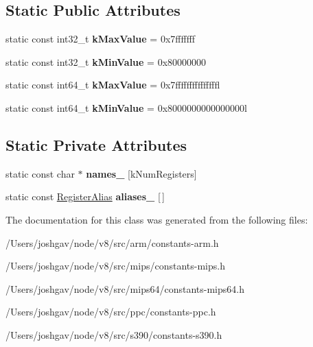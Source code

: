 \subsection*{Static Public Attributes}
\begin{DoxyCompactItemize}
\item 
static const int32\+\_\+t {\bfseries k\+Max\+Value} = 0x7fffffff\hypertarget{classv8_1_1internal_1_1_registers_a07435a8d8060dc8bfdc18d1ffbe1d10d}{}\label{classv8_1_1internal_1_1_registers_a07435a8d8060dc8bfdc18d1ffbe1d10d}

\item 
static const int32\+\_\+t {\bfseries k\+Min\+Value} = 0x80000000\hypertarget{classv8_1_1internal_1_1_registers_a977757720ff82e6ba769664028b5c014}{}\label{classv8_1_1internal_1_1_registers_a977757720ff82e6ba769664028b5c014}

\item 
static const int64\+\_\+t {\bfseries k\+Max\+Value} = 0x7fffffffffffffffl\hypertarget{classv8_1_1internal_1_1_registers_a14c98f9b0700cc0d0469cf55b68b07f5}{}\label{classv8_1_1internal_1_1_registers_a14c98f9b0700cc0d0469cf55b68b07f5}

\item 
static const int64\+\_\+t {\bfseries k\+Min\+Value} = 0x8000000000000000l\hypertarget{classv8_1_1internal_1_1_registers_acede0eeb70488c436626ca92303d2072}{}\label{classv8_1_1internal_1_1_registers_acede0eeb70488c436626ca92303d2072}

\end{DoxyCompactItemize}
\subsection*{Static Private Attributes}
\begin{DoxyCompactItemize}
\item 
static const char $\ast$ {\bfseries names\+\_\+} \mbox{[}k\+Num\+Registers\mbox{]}\hypertarget{classv8_1_1internal_1_1_registers_a758349764f0b67108fce3f91897f5251}{}\label{classv8_1_1internal_1_1_registers_a758349764f0b67108fce3f91897f5251}

\item 
static const \hyperlink{structv8_1_1internal_1_1_registers_1_1_register_alias}{Register\+Alias} {\bfseries aliases\+\_\+} \mbox{[}$\,$\mbox{]}\hypertarget{classv8_1_1internal_1_1_registers_a5b4d1208eaf89a53b8c9ae5da336cba0}{}\label{classv8_1_1internal_1_1_registers_a5b4d1208eaf89a53b8c9ae5da336cba0}

\end{DoxyCompactItemize}


The documentation for this class was generated from the following files\+:\begin{DoxyCompactItemize}
\item 
/\+Users/joshgav/node/v8/src/arm/constants-\/arm.\+h\item 
/\+Users/joshgav/node/v8/src/mips/constants-\/mips.\+h\item 
/\+Users/joshgav/node/v8/src/mips64/constants-\/mips64.\+h\item 
/\+Users/joshgav/node/v8/src/ppc/constants-\/ppc.\+h\item 
/\+Users/joshgav/node/v8/src/s390/constants-\/s390.\+h\end{DoxyCompactItemize}
